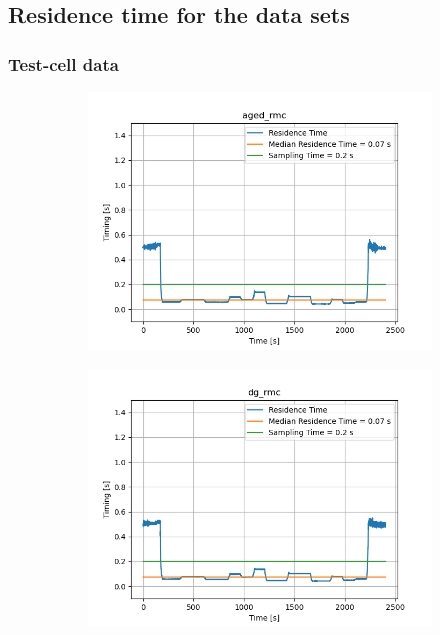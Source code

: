 \subsection{Residence time for the data sets \label{app:res_time_plots}}
\subsubsection{Test-cell data}
\begin{figure}[H]
    \begin{minipage}{0.49\textwidth}
        \begin{figure}[H]
            \includegraphics[width=\textwidth]{figs/res_time/aged_rmc_timing_stuff.png}
        \end{figure}
    \end{minipage}
    \begin{minipage}{0.49\textwidth}
        \begin{figure}[H]
            \includegraphics[width=\textwidth]{figs/res_time/dg_rmc_timing_stuff.png}

\end{figure}
\end{minipage}
\end{figure}
